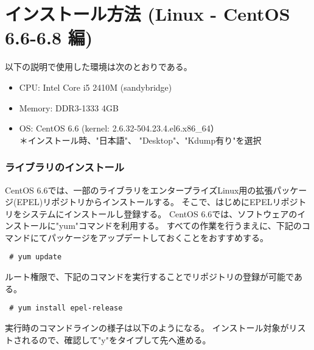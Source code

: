\section{インストール方法 (Linux - CentOS 6.6-6.8 編)} \label{chap:install_centos}

以下の説明で使用した環境は次のとおりである。
\begin{itemize}
\item CPU: Intel Core i5 2410M (sandybridge)
\item Memory: DDR3-1333 4GB
\item OS: CentOS 6.6 (kernel: 2.6.32-504.23.4.el6.x86\_64）\\
{\small ＊インストール時、"日本語"、 "Desktop"、"Kdump有り"を選択}
\end{itemize}

\subsubsection{ライブラリのインストール}

CentOS 6.6では、一部のライブラリをエンタープライズLinux用の拡張パッケージ(EPEL)リポジトリからインストールする。
そこで、はじめにEPELリポジトリをシステムにインストールし登録する。
CentOS 6.6では、ソフトウェアのインストールに"yum"コマンドを利用する。
すべての作業を行うまえに、下記のコマンドにてパッケージをアップデートしておくことをおすすめする。
\begin{verbatim}
 # yum update
\end{verbatim}

ルート権限で、下記のコマンドを実行することでリポジトリの登録が可能である。
\begin{verbatim}
 # yum install epel-release
\end{verbatim}
実行時のコマンドラインの様子は以下のようになる。
インストール対象がリストされるので、確認して"y"をタイプして先へ進める。\\

